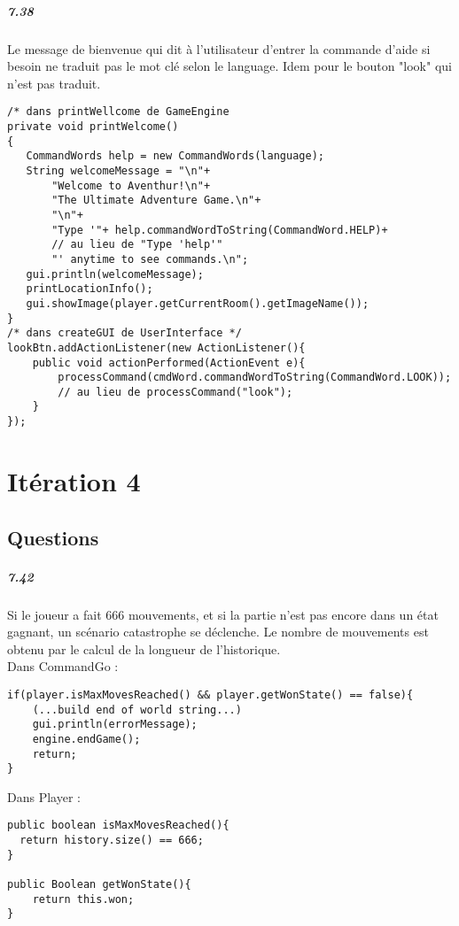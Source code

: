 \documentclass[11pt,a4paper]{report}
\begin{document}
\paragraph{7.38}
Le message de bienvenue qui dit à l'utilisateur d'entrer la commande d'aide si besoin ne traduit pas le mot clé selon le language. Idem pour le bouton "look" qui n'est pas traduit.
\begin{lstlisting}
/* dans printWellcome de GameEngine
private void printWelcome()
{
   CommandWords help = new CommandWords(language);
   String welcomeMessage = "\n"+
       "Welcome to Aventhur!\n"+
       "The Ultimate Adventure Game.\n"+
       "\n"+
       "Type '"+ help.commandWordToString(CommandWord.HELP)+
       // au lieu de "Type 'help'"
       "' anytime to see commands.\n";
   gui.println(welcomeMessage);
   printLocationInfo();
   gui.showImage(player.getCurrentRoom().getImageName());
}
/* dans createGUI de UserInterface */
lookBtn.addActionListener(new ActionListener(){
    public void actionPerformed(ActionEvent e){
        processCommand(cmdWord.commandWordToString(CommandWord.LOOK));
        // au lieu de processCommand("look");
    }
});
\end{lstlisting}


\chapter{Itération 4}
\section{Questions}

\paragraph{7.42}
Si le joueur a fait 666 mouvements, et si la partie n'est pas encore dans un état gagnant, un scénario catastrophe se déclenche. Le nombre de mouvements est obtenu par le calcul de la longueur de l'historique. \\
Dans CommandGo :
\begin{lstlisting}
if(player.isMaxMovesReached() && player.getWonState() == false){
    (...build end of world string...)
    gui.println(errorMessage);
    engine.endGame();
    return;
}
\end{lstlisting}
Dans Player :\\
\begin{lstlisting}
public boolean isMaxMovesReached(){
  return history.size() == 666;
}

public Boolean getWonState(){
    return this.won;
}
\end{lstlisting}
\end{document}
